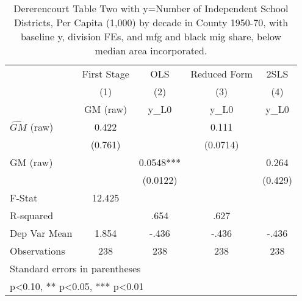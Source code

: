 \begin{table}[htbp]\centering
\def\sym#1{\ifmmode^{#1}\else\(^{#1}\)\fi}
\caption{Dererencourt Table Two with y=Number of Independent School Districts, Per Capita (1,000) by decade in County 1950-70, with baseline y, division FEs, and mfg and black mig share, below median area incorporated.}
\begin{tabular}{l*{4}{c}}
\toprule
                    & First Stage   &         OLS   &Reduced Form   &        2SLS   \\
                    &\multicolumn{1}{c}{(1)}&\multicolumn{1}{c}{(2)}&\multicolumn{1}{c}{(3)}&\multicolumn{1}{c}{(4)}\\
                    &\multicolumn{1}{c}{GM  (raw)}&\multicolumn{1}{c}{y\_L0}&\multicolumn{1}{c}{y\_L0}&\multicolumn{1}{c}{y\_L0}\\
\midrule
$\hat{GM}$ (raw)    &       0.422   &               &       0.111   &               \\
                    &     (0.761)   &               &    (0.0714)   &               \\
\addlinespace
GM  (raw)           &               &      0.0548***&               &       0.264   \\
                    &               &    (0.0122)   &               &     (0.429)   \\
\midrule
F-Stat              &      12.425   &               &               &               \\
R-squared           &               &        .654   &        .627   &               \\
Dep Var Mean        &       1.854   &       -.436   &       -.436   &       -.436   \\
Observations        &         238   &         238   &         238   &         238   \\
\bottomrule
\multicolumn{5}{l}{\footnotesize Standard errors in parentheses}\\
\multicolumn{5}{l}{\footnotesize * p<0.10, ** p<0.05, *** p<0.01}\\
\end{tabular}
\end{table}
